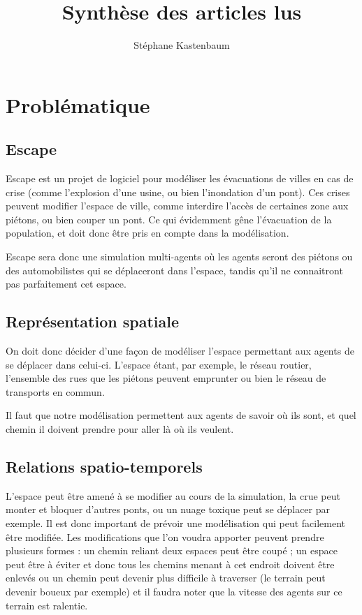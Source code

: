 \documentclass[a4paper]{article}
\title{Synthèse des articles lus}
\author{Stéphane Kastenbaum}
\begin{document}
\maketitle

\section{Problématique}

\subsection{Escape}

Escape est un projet de logiciel pour modéliser les évacuations de villes en cas
de crise (comme l'explosion d'une usine, ou bien l'inondation d'un pont).  Ces
crises peuvent modifier l'espace de ville, comme interdire l'accès de certaines
zone aux piétons, ou bien couper un pont. Ce qui évidemment gêne l'évacuation
de la population, et doit donc être pris en compte dans la modélisation.

Escape sera donc une simulation multi-agents où les agents seront des piétons
ou des automobilistes qui se déplaceront dans l'espace, tandis qu'il ne
connaitront pas parfaitement cet espace.

\subsection{Représentation spatiale}

On doit donc décider d'une façon de modéliser l'espace permettant aux agents de
se déplacer dans celui-ci. L'espace étant, par exemple, le réseau routier,
l'ensemble des rues que les piétons peuvent emprunter ou bien le réseau de
transports en commun.

Il faut que notre modélisation permettent aux agents de savoir où ils sont, et
quel chemin il doivent prendre pour aller là où ils veulent.

\subsection{Relations spatio-temporels}

L'espace peut être amené à se modifier au cours de la simulation, la crue peut
monter et bloquer d'autres ponts, ou un nuage toxique peut se déplacer par
exemple. Il est donc important de prévoir une modélisation qui peut facilement
être modifiée. Les modifications que l'on voudra apporter peuvent prendre
plusieurs formes : un chemin reliant deux espaces peut être coupé ; un espace
peut être à éviter et donc tous les chemins menant à cet endroit doivent être
enlevés ou un chemin peut devenir plus difficile à traverser (le terrain peut
devenir boueux par exemple) et il faudra noter que la vitesse des agents sur ce
terrain est ralentie.
\end{document}

